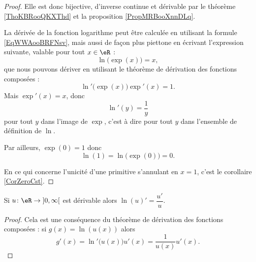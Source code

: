 \begin{proof}
    Elle est donc bijective, d'inverse continue et dérivable par le théorème \ref{ThoKBRooQKXThd} et la proposition \ref{PropMRBooXnnDLq}. 

    La dérivée de la fonction logarithme peut être calculée en utilisant la formule \eqref{EqWWAooBRFNsv}, mais aussi de façon plus piettone en écrivant l'expression suivante, valable pour tout \( x\in \eR\) :
    \begin{equation}
        \ln\big( \exp(x) \big)=x,
    \end{equation}
    que nous pouvons dériver en utilisant le théorème de dérivation des fonctions composées :
    \begin{equation}
        \ln'\big( \exp(x) \big)\exp'(x)=1.
    \end{equation}
    Mais \( \exp'(x)=x\), donc
    \begin{equation}
        \ln'(y)=\frac{1}{ y }
    \end{equation}
    pour tout \( y\) dans l'image de \( \exp\), c'est à dire pour tout \( y\) dans l'ensemble de définition de \( \ln\).

    Par ailleurs, \( \exp(0)=1\) donc
    \begin{equation}
        \ln(1)=\ln\big( \exp(0) \big)=0.
    \end{equation}

    En ce qui concerne l'unicité d'une primitive s'annulant en \( x=1\), c'est le corollaire \ref{CorZeroCst}.
\end{proof}

\begin{lemma}
Si \( u\colon \eR\to \mathopen] 0 , \infty \mathclose[\) est dérivable alors \( \ln(u)'=\dfrac{ u' }{ u }\).
\end{lemma}

\begin{proof}
    Cela est une conséquence du théorème de dérivation des fonctions composées : si \( g(x)=\ln(u(x))\) alors
    \begin{equation}
        g'(x)=\ln'\big( u(x) \big)u'(x)=\frac{1}{ u(x) }u'(x).
    \end{equation}
\end{proof}

